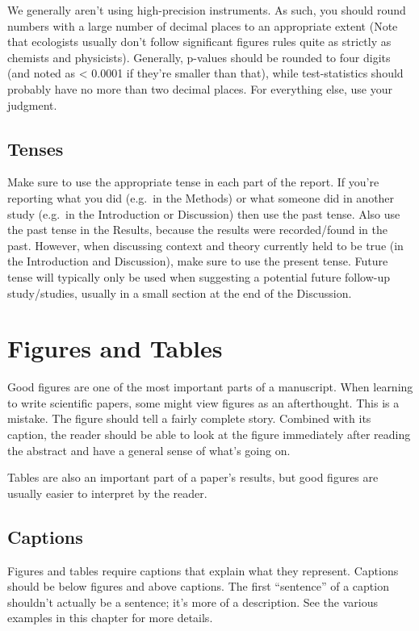 \documentclass[]{book}
\begin{document}
We generally aren't using high-precision instruments. As such, you
should round numbers with a large number of decimal places to an
appropriate extent (Note that ecologists usually don't follow
significant figures rules quite as strictly as chemists and physicists).
Generally, p-values should be rounded to four digits (and noted as
\textless{} 0.0001 if they're smaller than that), while test-statistics
should probably have no more than two decimal places. For everything
else, use your judgment.

\section{Tenses}\label{tenses}

Make sure to use the appropriate tense in each part of the report. If
you're reporting what you did (e.g.~in the Methods) or what someone did
in another study (e.g.~in the Introduction or Discussion) then use the
past tense. Also use the past tense in the Results, because the results
were recorded/found in the past. However, when discussing context and
theory currently held to be true (in the Introduction and Discussion),
make sure to use the present tense. Future tense will typically only be
used when suggesting a potential future follow-up study/studies, usually
in a small section at the end of the Discussion.

\chapter{Figures and Tables}\label{figures}

Good figures are one of the most important parts of a manuscript. When
learning to write scientific papers, some might view figures as an
afterthought. This is a mistake. The figure should tell a fairly
complete story. Combined with its caption, the reader should be able to
look at the figure immediately after reading the abstract and have a
general sense of what's going on.

Tables are also an important part of a paper's results, but good figures
are usually easier to interpret by the reader.

\section{Captions}\label{captions}

Figures and tables require captions that explain what they represent.
Captions should be below figures and above captions. The first
``sentence'' of a caption shouldn't actually be a sentence; it's more of
a description. See the various examples in this chapter for more
details.
\end{document}
